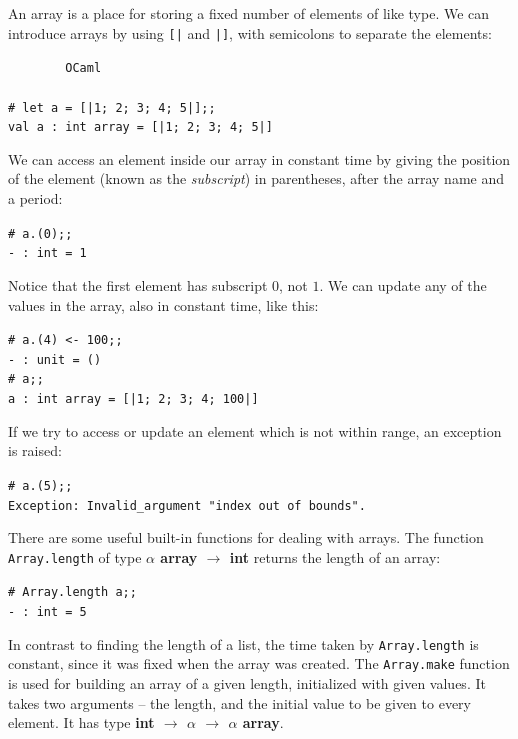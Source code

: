 \documentclass[]{book}
\newcommand{\smspace}{\vspace{4mm}}
\begin{document}
An array is a place for storing a fixed number of elements of like type. We can introduce arrays by using \texttt{[|} and \texttt{|]}, with semicolons to separate the elements:

\smspace
\noindent\verb!        OCaml!\\
\noindent\\
\noindent\verb!# let a = [|1; 2; 3; 4; 5|];;!\\
\noindent\verb!val a : int array = [|1; 2; 3; 4; 5|]!
\smspace

\noindent We can access an element inside our array in constant time by giving the position of the element (known as the \textit{subscript}) in parentheses, after the array name and a period:

\smspace
\noindent\verb!# a.(0);;!\\
\noindent\verb!- : int = 1!
\smspace

\noindent Notice that the first element has subscript $0$, not $1$. We can update any of the values in the array, also in constant time, like this:

\smspace
\noindent\verb!# a.(4) <- 100;;!\\
\noindent\verb!- : unit = ()!\\
\noindent\verb!# a;;!\\
\noindent\verb!a : int array = [|1; 2; 3; 4; 100|]!
\smspace

\noindent If we try to access or update an element which is not within range, an exception is raised:

\smspace
\noindent\verb!# a.(5);;!\\
\noindent\verb!Exception: Invalid_argument "index out of bounds".!
\smspace

\noindent There are some useful built-in functions for dealing with arrays. The function \texttt{Array.length} of type \textbf{\textsf{$\alpha$ array $\rightarrow$ int}} returns the length of an array:

\smspace
\noindent\verb!# Array.length a;;!\\
\noindent\verb!- : int = 5!
\smspace

\noindent In contrast to finding the length of a list, the time taken by \texttt{Array.length} is constant, since it was fixed when the array was created. The \texttt{Array.make} function is used for building an array of a given length, initialized with given values. It takes two arguments -- the length, and the initial value to be given to every element. It has type \textsf{\textbf{int $\rightarrow$ $\alpha$ $\rightarrow$ $\alpha$ array}}.
\end{document}
